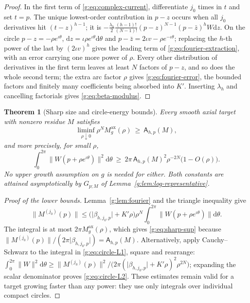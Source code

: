 \documentclass[11pt,a4paper]{article}
\numberwithin{equation}{section}
\newtheorem{theorem}{Theorem}[section]
\theoremstyle{definition}
\theoremstyle{remark}
\theoremstyle{plain}
\newcommand{\Max}{M^{\mathrm{ax}}}                    %
\newcommand{\abs}[1]{\lvert #1\rvert}
\newcommand{\norm}[1]{\lVert #1\rVert}
\newcommand{\dd}{\mathrm d}
\begin{document}
\begin{proof}
In the first term of \eqref{g:eq:complex-current}, differentiate $j_0$ times in
$t$ and set $t=p$. The unique lowest-order contribution in $p-z$ occurs when
all $j_0$ derivatives hit $(t-z)^{h-1}$; it is
$-\frac{\lambda_h}{2}\frac{(h-1)!}{(N-1)!}(p-z)^{N-1}(p-\bar z)^hW\dd z$. On the
circle $p-z=-\rho e^{\iota\theta}$, $\dd z=\iota\rho e^{\iota\theta}\dd\theta$ and
$p-\bar z=2\iota v-\rho e^{-\iota\theta}$; replacing the $h$-th power of the last
by $(2\iota v)^h$ gives the leading term of \eqref{g:eq:fourier-extraction},
with an error carrying one more power of $\rho$. Every other distribution of
derivatives in the first term leaves at least $N$ factors of $p-z$, and so does
the whole second term; the extra arc factor $\rho$ gives
\eqref{g:eq:fourier-error}, the bounded factors and finitely many
coefficients being absorbed into $K'$. Inserting $\lambda_h$ and cancelling
factorials gives \eqref{g:eq:beta-modulus}.
\end{proof}

\begin{theorem}[Sharp size and circle-energy bounds]
\label{g:thm:sharp-size}
Every smooth axial target with nonzero residue $M$ satisfies
\begin{equation}\label{g:eq:sharp-sup}
 \liminf_{\rho\downarrow0}\rho^N\Max_g(\rho)\ \ge\ \mathsf A_{h,p}(M),
\end{equation}
and more precisely, for small $\rho$,
\begin{equation}\label{g:eq:circle-L2}
 \int_0^{2\pi}\norm{W(p+\rho e^{\iota\theta})}^2\dd\theta\ \ge\
 2\pi\,\mathsf A_{h,p}(M)^2\rho^{-2N}\bigl(1-O(\rho)\bigr).
\end{equation}
No upper growth assumption on $g$ is needed for either. Both constants are
attained asymptotically by $G_{p;M}$ of Lemma~\ref{g:lem:log-representative}.
\end{theorem}

\begin{proof}[Proof of the lower bounds]
Lemma~\ref{g:lem:fourier} and the triangle inequality give
\begin{equation}\label{g:eq:circle-L1}
 \norm{M^{(j_0)}(p)}\le\bigl(\abs{\beta_{h,j_0,p}}+K'\rho\bigr)\rho^N
 \int_0^{2\pi}\norm{W(p+\rho e^{\iota\theta})}\dd\theta .
\end{equation}
The integral is at most $2\pi\Max_g(\rho)$, which gives \eqref{g:eq:sharp-sup}
because $\norm{M^{(j_0)}(p)}/(2\pi\abs{\beta_{h,j_0,p}})=\mathsf A_{h,p}(M)$.
Alternatively, apply Cauchy--Schwarz to the integral in \eqref{g:eq:circle-L1},
square and rearrange:
$\int_0^{2\pi}\norm W^2\dd\theta\ge\norm{M^{(j_0)}(p)}^2\big/
\bigl(2\pi(\abs{\beta_{h,j_0,p}}+K'\rho)^2\rho^{2N}\bigr)$; expanding the scalar
denominator proves \eqref{g:eq:circle-L2}. These estimates remain valid for a
target growing faster than any power: they use only integrals over individual
compact circles.
\end{proof}
\end{document}
